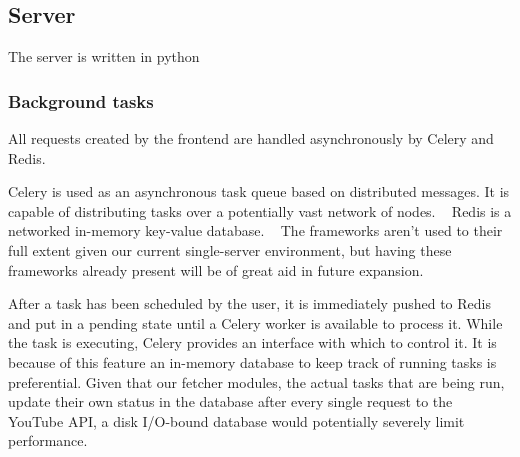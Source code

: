 

\subsection{Server}
The server is written in python %


\subsubsection{Background tasks}
All requests created by the frontend are handled asynchronously by Celery and
Redis.

Celery is used as an asynchronous task queue based on distributed messages. It
is capable of distributing tasks over a potentially vast network of nodes.
~\cite{architecture:celery} Redis is a networked in-memory key-value database.
~\cite{architecture:redis} The frameworks aren't used to their full extent given
our current single-server environment, but having these frameworks already
present will be of great aid in future expansion.

After a task has been scheduled by the user, it is immediately pushed to Redis
and put in a pending state until a Celery worker is available to process it.
While the task is executing, Celery provides an interface with which to control
it. It is because of this feature an in-memory database to keep track of running
tasks is preferential. Given that our fetcher modules, the actual tasks that are
being run, update their own status in the database after every single request to
the YouTube API, a disk I/O-bound database would potentially severely limit
performance.

